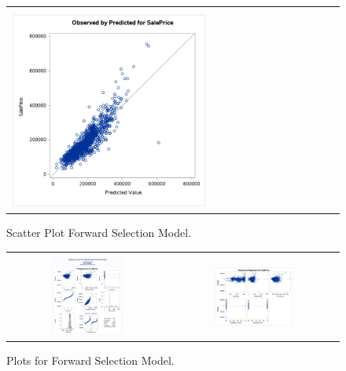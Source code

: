 \documentclass[11pt]{scrartcl} %
\begin{document}
\begin{figure}[H] %
	\centering
	\begin{tabular}{| p{}|}
	\hline
	\\
	\includegraphics[width=0.60\textwidth]{../graphics/A2FWscatt}\\
	\hline
	\end{tabular}	
	\caption{Scatter Plot Forward Selection Model.}
	\label{fig:A2FWscatt}
\end{figure}
\begin{figure}[H] %
	\centering
	\begin{tabular}{p{} p{}}
	\hline
	\multicolumn{1}{|c}{} &  \multicolumn{1}{c|}{} \\
		\multicolumn{1}{|c}{\includegraphics[width=0.48\textwidth]{../graphics/A2FWAss1}} &
		\multicolumn{1}{c|}{\includegraphics[width=0.48\textwidth]{../graphics/A2FWAss2}}\\
		\hline
	\end{tabular}		
	\caption{Plots for Forward Selection Model.}
	\label{fig:A2FWAss}
\end{figure}
\end{document}

